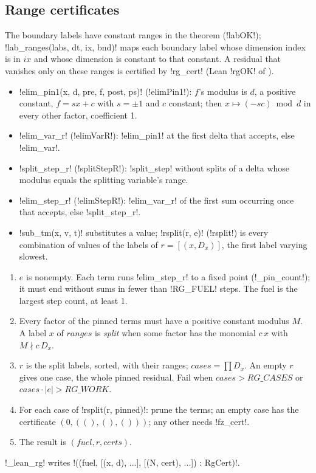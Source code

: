 {{{\subsection{Range certificates}\label{sec:lean-export-sym-rg}

The boundary labels have constant ranges in the theorem (\lexlean!labOK!);
\lexpy!lab_ranges(labs, dt, ix, bnd)! maps each boundary label whose dimension index is in $ix$ and
whose dimension is constant to that constant. A residual that vanishes only on these ranges is
certified by \lexpy!rg_cert! (Lean \lexlean!rgOK! of ).

\begin{itemize}
\item \lexpy!elim_pin1(x, d, pre, f, post, ps)! (\lexlean!elimPin1!): $f$'s modulus is $d$, a positive
constant, $f = sx + c$ with $s=\pm1$ and $c$ constant; then $x \mapsto (-sc) \bmod d$ in every
other factor, coefficient 1.
\item \lexpy!elim_var_r! (\lexlean!elimVarR!): \lexpy!elim_pin1! at the first delta that accepts, else
\lexpy!elim_var!.
\item \lexpy!split_step_r! (\lexlean!splitStepR!): \lexpy!split_step! without splits of a delta whose
modulus equals the splitting variable's range.
\item \lexpy!elim_step_r! (\lexlean!elimStepR!): \lexpy!elim_var_r! of the first sum occurring once
that accepts, else \lexpy!split_step_r!.
\item \lexpy!sub_tm(x, v, t)! substitutes a value; \lexpy!rsplit(r, e)! (\lexlean!rsplit!) is every
combination of values of the labels of $r = [(x, D_x)]$, the first label varying slowest.
\end{itemize}

\begin{algorithm}\label{alg:lean-export-sym-rg}
\begin{enumerate}
\item $e$ is nonempty. Each term runs \lexpy!elim_step_r! to a fixed point (\lexpy!_pin_count!); it
must end without sums in fewer than \lexpy!RG_FUEL! steps. The fuel is the largest step count, at
least 1.
\item Every factor of the pinned terms must have a positive constant modulus $M$. A label $x$ of
$ranges$ is \emph{split} when some factor has the monomial $c\,x$ with $M \nmid c\,D_x$.
\item $r$ is the split labels, sorted, with their ranges; $\mathit{cases} = \prod D_x$. An empty
$r$ gives one case, the whole pinned residual. Fail when $\mathit{cases} > \mathit{RG\_CASES}$ or $\mathit{cases}\cdot|e| >
\mathit{RG\_WORK}$.
\item For each case of \lexpy!rsplit(r, pinned)!: prune the terms; an empty case has the
certificate $(0, ((), (), ()))$; any other needs \lexpy!fz_cert!.
\item The result is $(\mathit{fuel}, r, \mathit{certs})$.
\end{enumerate}
\end{algorithm}
\lexpy!_lean_rg! writes \lexlean!((fuel, [(x, d), ...], [(N, cert), ...]) : RgCert)!.

}}}
